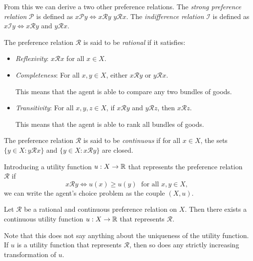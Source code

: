 \documentclass[twoside]{article}
\begin{document}
From this we can derive a two other preference relations. The \textit{strong preference relation} $\mathcal{P}$ is defined as $x \mathcal{P} y \iff x \mathcal{R} y$  $y \mathcal{R} x$. The \textit{indifference relation} $\mathcal{I}$ is defined as $x \mathcal{I} y \iff x \mathcal{R} y $ and $y \mathcal{R} x$.

\begin{assumption}[Rationality] \label{ass:rationality}
    The preference relation $\mathcal{R}$ is said to be \textit{rational} if it satisfies:
    \begin{itemize}
        \item \textit{Reflexivity}: $x \mathcal{R} x$ for all $x \in X$.
        \item \textit{Completeness}: For all $x, y \in X$, either $x \mathcal{R} y$ or $y \mathcal{R} x$.
        \begin{explanation}
            This means that the agent is able to compare any two bundles of goods.
        \end{explanation}
        \item \textit{Transitivity}: For all $x, y, z \in X$, if $x \mathcal{R} y$ and $y \mathcal{R} z$, then $x \mathcal{R} z$.
        \begin{explanation}
            This means that the agent is able to rank all bundles of goods.
        \end{explanation}
    \end{itemize}
\end{assumption}

\begin{assumption}[Continuity] \label{ass:continuity}
    The preference relation $\mathcal{R}$ is said to be \textit{continuous} if for all $x \in X$, the sets $\{y \in X : y \mathcal{R} x\}$ and $\{y \in X : x \mathcal{R} y\}$ are closed.
\end{assumption}

Introducing a utility function $u : X \to \mathbb{R}$ that represents the preference relation $\mathcal{R}$ if 
\[
    x \mathcal{R} y \iff u(x) \geq u(y) \; \text{ for all } x, y \in X,
\]
we can write the agent's choice problem as the couple $(X, u)$. 

\begin{theorem}
    Let $\mathcal{R}$ be a rational and continuous preference relation on $X$. Then there exists a continuous utility function $u : X \to \mathbb{R}$ that represents $\mathcal{R}$.
\end{theorem}
Note that this does not say anything about the uniqueness of the utility function. If $u$ is a utility function that represents $\mathcal{R}$, then so does any strictly increasing transformation of $u$.
\end{document}
